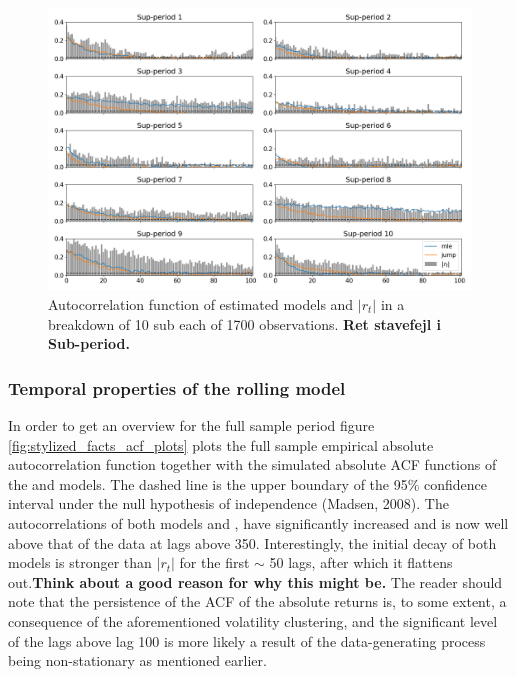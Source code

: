 \begin{figure}[H] 
    \centering
    \includegraphics[width=1.0\textwidth]{analysis/stylized_facts/images/acf_abs_subperiods.png}
    \caption[Autocorrelation function of estimated models and $|r_t|$ on subsamples]{Autocorrelation function of estimated models and $|r_t|$ in a breakdown of 10 sub each of 1700 observations. \textbf{Ret stavefejl i Sub-period.}}
    \label{fig:stylized_facts_acf_plots_sub_periods} 
\end{figure}

\subsubsection{Temporal properties of the rolling model}

In order to get an overview for the full sample period figure \ref{fig:stylized_facts_acf_plots} plots the full sample empirical absolute autocorrelation function together with the simulated absolute ACF functions of the \mle and \jump models. The dashed line is the upper boundary of the 95\% confidence interval under the null hypothesis of independence (Madsen, 2008). The autocorrelations of both models \mle and \jump, have significantly increased and is now well above that of the data at lags above 350. Interestingly, the initial decay of both models is stronger than $|r_t|$ for the first $\sim$ 50 lags, after which it flattens out.\textbf{Think about a good reason for why this might be.}
The reader should note that the persistence of the ACF of the absolute returns is, to some extent, a consequence of the aforementioned volatility clustering, and the significant level of the lags above lag 100 is more likely a result of the data-generating process being non-stationary as mentioned earlier. 

